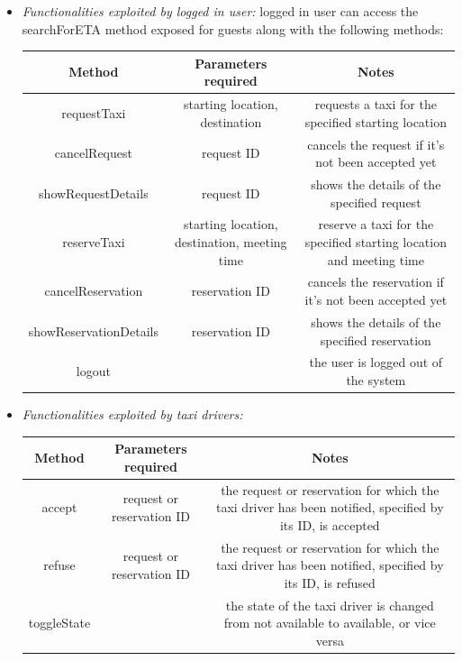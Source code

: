 \documentclass{article}
\begin{document}
\begin{itemize}
		\item \textit{Functionalities exploited by logged in user:} logged in user can access the searchForETA method exposed for guests along with the following methods: \\
		\begin{table}[H]
			\begin{adjustbox}{width=1.2\textwidth}
				\begin{tabular}{*{3}{c}}
					\toprule
					Method & Parameters required & Notes \\
					\midrule
					requestTaxi & starting location, destination & requests a taxi for the specified starting location \\ 
					cancelRequest & request ID & cancels the request if it's not been accepted yet\\ 
					showRequestDetails & request ID & shows the details of the specified request\\
					reserveTaxi & starting location, destination, meeting time & reserve a taxi for the specified starting location and meeting time \\
					cancelReservation & reservation ID & cancels the reservation if it's not been accepted yet\\
					showReservationDetails & reservation ID & shows the details of the specified reservation\\
					logout &  & the user is logged out of the system \\
					\bottomrule
				\end{tabular}
			\end{adjustbox}
		\end{table}	
		\item \textit{Functionalities exploited by taxi drivers:}\\
		\begin{table}[H]
			\begin{adjustbox}{width=1.2\textwidth}
				\begin{tabular}{*{3}{c}}
					\toprule
					Method & Parameters required & Notes \\
					\midrule
					accept & request or reservation ID & the request or reservation for which the taxi driver has been notified, specified by its ID, is accepted \\ 
					refuse & request or reservation ID & the request or reservation for which the taxi driver has been notified, specified by its ID, is refused\\ 
					toggleState & & the state of the taxi driver is changed from not available to available, or vice versa\\

\end{tabular}
\end{adjustbox}
\end{table}
\end{itemize}
\end{document}
